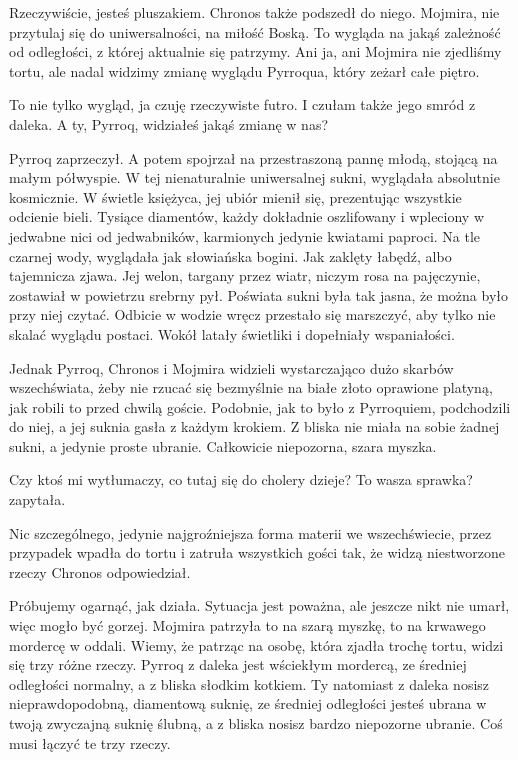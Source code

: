 \ds{} Rzeczywiście, jesteś pluszakiem. \dm{} Chronos także podszedł do niego. \dm{} Mojmira, nie przytulaj się do uniwersalności, na miłość Boską.
To wygląda na jakąś zależność od odległości, z której aktualnie się patrzymy. Ani ja, ani Mojmira nie zjedliśmy tortu, ale nadal widzimy zmianę wyglądu Pyrroqua, który zeżarł całe piętro. \de{}

\ds{} To nie tylko wygląd, ja czuję rzeczywiste futro. I czułam także jego smród z daleka. A ty, Pyrroq, widziałeś jakąś zmianę w nas? \de{}

Pyrroq zaprzeczył. A potem spojrzał na przestraszoną pannę młodą, stojącą na małym półwyspie.
W tej nienaturalnie uniwersalnej sukni, wyglądała absolutnie kosmicznie.
W świetle księżyca, jej ubiór mienił się, prezentując wszystkie odcienie bieli.
Tysiące diamentów, każdy dokładnie oszlifowany i wpleciony w jedwabne nici od jedwabników, karmionych jedynie kwiatami paproci.
Na tle czarnej wody, wyglądała jak słowiańska bogini. Jak zaklęty łabędź, albo tajemnicza zjawa.
Jej welon, targany przez wiatr, niczym rosa na pajęczynie, zostawiał w powietrzu srebrny pył.
Poświata sukni była tak jasna, że można było przy niej czytać.
Odbicie w wodzie wręcz przestało się marszczyć, aby tylko nie skalać wyglądu postaci.
Wokół latały świetliki i dopełniały wspaniałości.

Jednak Pyrroq, Chronos i Mojmira widzieli wystarczająco dużo skarbów wszechświata, żeby nie rzucać się bezmyślnie na białe złoto oprawione platyną, 
jak robili to przed chwilą goście.
Podobnie, jak to było z Pyrroquiem, podchodzili do niej, a jej suknia gasła z każdym krokiem.
Z bliska nie miała na sobie żadnej sukni, a jedynie proste ubranie. Całkowicie niepozorna, szara myszka.

\ds{} Czy ktoś mi wytłumaczy, co tutaj się do cholery dzieje? To wasza sprawka? \dm{} zapytała. \de{}

\ds{} Nic szczególnego, jedynie najgroźniejsza forma materii we wszechświecie, przez przypadek wpadła do tortu i zatruła wszystkich gości tak, że widzą niestworzone rzeczy \dm{}
Chronos odpowiedział.\de{}

\ds{} Próbujemy ogarnąć, jak działa. Sytuacja jest poważna, ale jeszcze nikt nie umarł, więc mogło być gorzej. \dm{} Mojmira patrzyła to na szarą myszkę, to na krwawego mordercę w oddali. \dm{}
Wiemy, że patrząc na osobę, która zjadła trochę tortu, widzi się trzy różne rzeczy. Pyrroq z daleka jest wściekłym mordercą, ze średniej odległości normalny, a z bliska słodkim kotkiem.
Ty natomiast z daleka nosisz nieprawdopodobną, diamentową suknię, ze średniej odległości jesteś ubrana w twoją zwyczajną suknię ślubną, a z bliska nosisz bardzo niepozorne ubranie.
Coś musi łączyć te trzy rzeczy. \de{}

